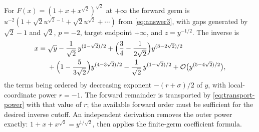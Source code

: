 \begin{example}
For $F(x)=(1+x+x^{\sqrt2})^{\sqrt2}$ at $+\infty$ the forward germ is $u^{-2}(1+\sqrt2u^{\sqrt2-1}+\sqrt2u^{\sqrt2}+\cdots)$ from \eqref{eq:answer3}, with gaps generated by $\sqrt2-1$ and $\sqrt2$, $p=-2$, target endpoint $+\infty$, and $z=y^{-1/2}$. The inverse is
\begin{equation}
\begin{aligned}
 x={}&\sqrt y-\frac{1}{\sqrt2}\,y^{(2-\sqrt2)/2}+\Bigl(\frac34-\frac1{2\sqrt2}\Bigr)y^{(3-2\sqrt2)/2}\\
 &+\Bigl(1-\frac{5}{3\sqrt2}\Bigr)y^{(4-3\sqrt2)/2}-\frac{1}{\sqrt2}\,y^{(1-\sqrt2)/2}+\mathcal O\bigl(y^{(5-4\sqrt2)/2}\bigr),
\end{aligned}
 \label{eq:second-inverse}
\end{equation}
the terms being ordered by decreasing exponent $-(r+\sigma)/2$ of $y$, with local-coordinate power $r=-1$. The forward remainder is transported by \eqref{eq:transport-power} with that value of $r$; the available forward order must be sufficient for the desired inverse cutoff. An independent derivation removes the outer power exactly: $1+x+x^{\sqrt2}=y^{1/\sqrt2}$, then applies the finite-germ coefficient formula.
\end{example}
